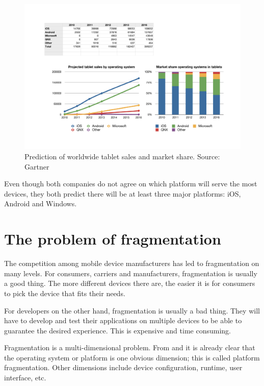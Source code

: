 \begin{figure}[h!]
    \begin{center}
        \includegraphics[width=\textwidth]{figs/tablet.pdf}
        \caption{
            Prediction of worldwide tablet sales and market share.\newline
            Source: Gartner \citeGartnerTab
        }
        \label{fig:tablet}
    \end{center}
\end{figure}

Even though both companies do not agree on which platform will serve the most devices, they both predict there will be at least three major platforms: iOS, Android and Windows. 

\section{The problem of fragmentation}

The competition among mobile device manufacturers has led to fragmentation on many levels. For consumers, carriers and manufacturers, fragmentation is usually a good thing. The more different devices there are, the easier it is for consumers to pick the device that fits their needs. 

For developers on the other hand, fragmentation is usually a bad thing. They will have to develop and test their applications on multiple devices to be able to guarantee the desired experience. This is expensive and time consuming.

Fragmentation is a multi-dimensional problem. From  and  it is already clear that the operating system or platform is one obvious dimension; this is called platform fragmentation. Other dimensions include device configuration, runtime, user interface, etc.

